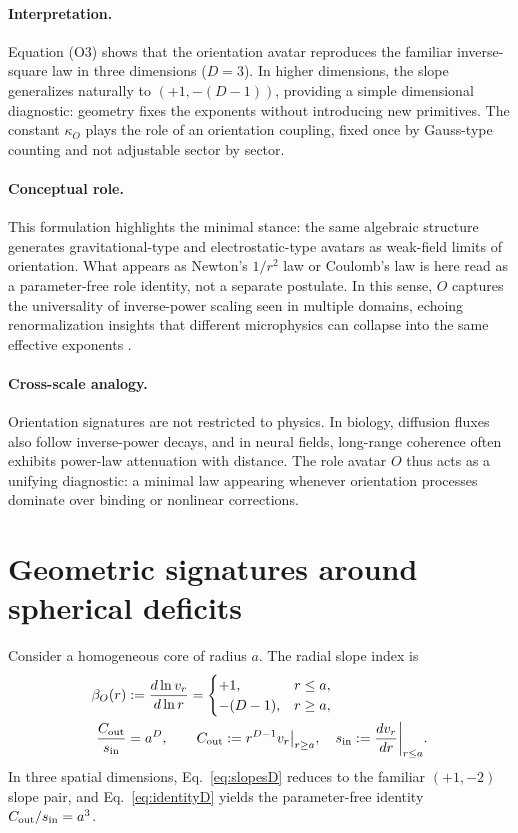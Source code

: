 \documentclass[12pt,a4paper,oneside]{scrreprt}
\begin{document}
\paragraph{Interpretation.} 
Equation (O3) shows that the orientation avatar reproduces the familiar 
inverse-square law in three dimensions ($D=3$). 
In higher dimensions, the slope generalizes naturally to $(+1, -(D{-}1))$, 
providing a simple dimensional diagnostic: geometry fixes the exponents without 
introducing new primitives. 
The constant $\kappa_O$ plays the role of an orientation coupling, fixed once 
by Gauss-type counting and not adjustable sector by sector.

\paragraph{Conceptual role.} 
This formulation highlights the minimal stance: the same algebraic structure 
generates gravitational-type and electrostatic-type avatars as weak-field 
limits of orientation. 
What appears as Newton’s $1/r^2$ law or Coulomb’s law is here read as a 
parameter-free role identity, not a separate postulate. 
In this sense, $O$ captures the universality of inverse-power scaling 
seen in multiple domains, echoing renormalization insights that 
different microphysics can collapse into the same effective exponents 
\citep{Wilson1971RG}.

\paragraph{Cross-scale analogy.} 
Orientation signatures are not restricted to physics. 
In biology, diffusion fluxes also follow inverse-power decays, 
and in neural fields, long-range coherence often exhibits 
power-law attenuation with distance. 
The role avatar $O$ thus acts as a unifying diagnostic: 
a minimal law appearing whenever orientation processes dominate 
over binding or nonlinear corrections.

\section{Geometric signatures around spherical deficits}\label{sec:ur-signatures}

Consider a homogeneous core of radius $a$. 
The radial slope index is
\begin{align}
\beta_O(r) &:= \frac{d\ln v_r}{d\ln r} 
= \begin{cases}
+1, & r \le a, \\
-(D-1), & r \ge a,
\end{cases} \label{eq:slopesD} \\
\frac{C_{\rm out}}{s_{\rm in}} &= a^{D}, \qquad 
C_{\rm out} := r^{D-1} v_r \big|_{r \ge a}, \quad
s_{\rm in} := \frac{dv_r}{dr}\bigg|_{r \le a}.
\label{eq:identityD}
\end{align}
In three spatial dimensions, Eq.~\eqref{eq:slopesD} reduces to the familiar $(+1,-2)$ slope pair, 
and Eq.~\eqref{eq:identityD} yields the parameter-free identity $C_{\rm out}/s_{\rm in} = a^3$.
\end{document}
